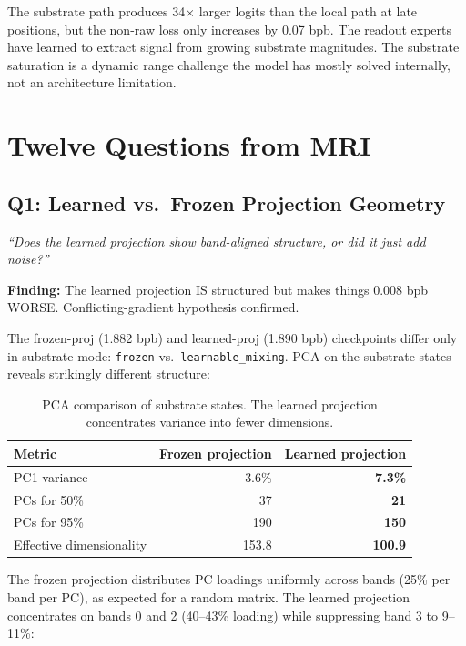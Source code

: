 \documentclass[11pt,a4paper]{report}
\newcommand{\cq}[1]{\textcolor{q}{\textit{``#1''}}}
\newcommand{\finding}[1]{\textcolor{finding}{\textbf{Finding:}} #1}
\begin{document}
The substrate path produces 34$\times$ larger logits than the local path at late positions, but the non-raw loss only increases by 0.07 bpb. The readout experts have learned to extract signal from growing substrate magnitudes. The substrate saturation is a dynamic range challenge the model has mostly solved internally, not an architecture limitation.


\chapter{Twelve Questions from MRI}

\section{Q1: Learned vs.\ Frozen Projection Geometry}

\cq{Does the learned projection show band-aligned structure, or did it just add noise?}

\finding{The learned projection IS structured but makes things 0.008 bpb WORSE. Conflicting-gradient hypothesis confirmed.}

The frozen-proj (1.882 bpb) and learned-proj (1.890 bpb) checkpoints differ only in substrate mode: \texttt{frozen} vs.\ \texttt{learnable\_mixing}. PCA on the substrate states reveals strikingly different structure:

\begin{table}[h]
\centering
\begin{tabular}{lrr}
\toprule
\textbf{Metric} & \textbf{Frozen projection} & \textbf{Learned projection} \\
\midrule
PC1 variance & 3.6\% & \textbf{7.3\%} \\
PCs for 50\% & 37 & \textbf{21} \\
PCs for 95\% & 190 & \textbf{150} \\
Effective dimensionality & 153.8 & \textbf{100.9} \\
\bottomrule
\end{tabular}
\caption{PCA comparison of substrate states. The learned projection concentrates variance into fewer dimensions.}
\label{tab:pca_comparison}
\end{table}

The frozen projection distributes PC loadings uniformly across bands (25\% per band per PC), as expected for a random matrix. The learned projection concentrates on bands 0 and 2 (40--43\% loading) while suppressing band 3 to 9--11\%:
\end{document}
